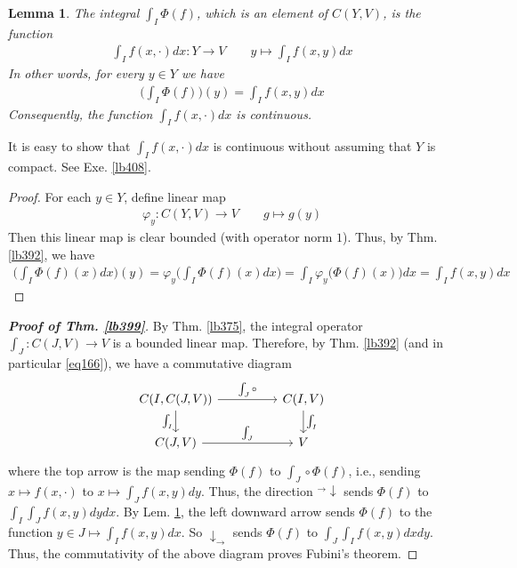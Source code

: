 \documentclass[12pt,b5paper,notitlepage]{article}
\theoremstyle{definition}
\theoremstyle{plain}
\newtheorem{lm}[df]{Lemma}
\numberwithin{equation}{section}
\begin{document}
\begin{lm}\label{lb400}
The integral  $\int_I\Phi(f)$, which is an element of $C(Y,V)$, is the function
\begin{align}
\int_If(x,\cdot)dx:Y\rightarrow V\qquad y\mapsto \int_I f(x,y)dx
\end{align}
In other words, for every $y\in Y$ we have
\begin{align}
\Big(\int_I\Phi(f)\Big)(y)=\int_I f(x,y)dx
\end{align}
Consequently, the function $\int_If(x,\cdot)dx$ is continuous.
\end{lm}


It is easy to show that $\int_If(x,\cdot)dx$ is continuous without assuming that $Y$ is compact. See Exe. \ref{lb408}.


\begin{proof}
For each $y\in Y$, define linear map
\begin{align*}
\varphi_y:C(Y,V)\rightarrow V\qquad g\mapsto g(y)
\end{align*}
Then this linear map is clear bounded (with operator norm $1$). Thus, by Thm. \ref{lb392}, we have
\begin{align*}
\Big(\int_I\Phi(f)(x)dx\Big)(y)=\varphi_y\Big(\int_I\Phi(f)(x)dx\Big)=\int_I\varphi_y\big(\Phi(f)(x)\big)dx=\int_I f(x,y)dx
\end{align*}
\end{proof}



\begin{proof}[\textbf{Proof of Thm. \ref{lb399}}]
By Thm. \ref{lb375}, the integral operator $\int_J:C(J,V)\rightarrow V$ is a bounded linear map. Therefore, by Thm. \ref{lb392} (and in particular \eqref{eq166}), we have a commutative diagram
\begin{equation*}
\begin{tikzcd}[column sep=huge]
C(I,C(J,V)) \arrow[r,"\int_J\circ"] \arrow[d,"\int_I"'] & C(I,V) \arrow[d,"\int_I"] \\
C(J,V) \arrow[r,"\int_J"]           & V          
\end{tikzcd} 
\end{equation*}
where the top arrow is the map sending $\Phi(f)$ to $\int_J\circ\Phi(f)$, i.e., sending $x\mapsto f(x,\cdot)$ to $x\mapsto \int_J f(x,y)dy$. Thus, the direction ${}^\rightarrow\!\downarrow$ sends $\Phi(f)$ to $\int_I\int_Jf(x,y)dydx$. By Lem. \ref{lb400}, the left downward arrow sends $\Phi(f)$ to the function $y\in J\mapsto \int_I f(x,y)dx$. So $\downarrow_\rightarrow$ sends $\Phi(f)$ to $\int_J\int_I f(x,y)dxdy$. Thus, the commutativity of the above diagram proves Fubini's theorem.
\end{proof}
\end{document}
